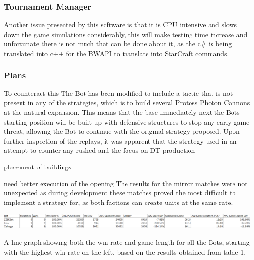\documentclass[journal]{IEEEtran}
\begin{document}
	
	\subsubsection{Tournament Manager}
	Another issue presented by this software is that it is CPU intensive and slows down the game simulations considerably, this will make testing time increase and unfortunate there is not much that can be done about it, as the c\# is being translated into c++ for the BWAPI to translate into StarCraft commands.
	
	\subsubsection{Plans}
	To counteract this The Bot has been modified to include a tactic that is not present in any of the strategies, which is to build several Protoss Photon Cannons at the natural expansion. This means that the base immediately next the Bots starting position will be built up with defensive structures to stop any early game threat, allowing the Bot to continue with the original strategy proposed.
	Upon further inspection of the replays, it was apparent that the strategy used in an attempt to counter any rushed and the focus on DT production
	
	placement of buildings
	
	need better execution of the opening
	The results for the mirror matches were not unexpected as during development these matches proved the most difficult to implement a strategy for, as both factions can create units at the same rate.
	\begin{table}
		\centering
		\includegraphics[width=\textwidth]{PvsBots}
		\caption{A line graph showing both the win rate and game length for all the Bots, starting with the highest win rate on the left, based on the results obtained from table 1.}
		\label{Table6}
	\end{table}
	
\end{document}
